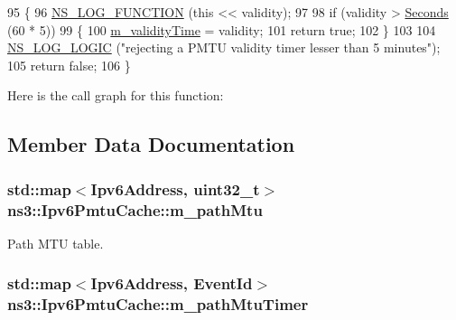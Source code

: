 \begin{DoxyCode}
95 \{
96   \hyperlink{log-macros-disabled_8h_a90b90d5bad1f39cb1b64923ea94c0761}{NS\_LOG\_FUNCTION} (\textcolor{keyword}{this} << validity);
97 
98   \textcolor{keywordflow}{if} (validity > \hyperlink{group__timecivil_ga33c34b816f8ff6628e33d5c8e9713b9e}{Seconds} (60 * 5))
99     \{
100       \hyperlink{classns3_1_1Ipv6PmtuCache_aad204229ec877a85eaebb1e9dd0f01d2}{m\_validityTime} = validity;
101       \textcolor{keywordflow}{return} \textcolor{keyword}{true};
102     \}
103 
104   \hyperlink{group__logging_ga88acd260151caf2db9c0fc84997f45ce}{NS\_LOG\_LOGIC} (\textcolor{stringliteral}{"rejecting a PMTU validity timer lesser than 5 minutes"});
105   \textcolor{keywordflow}{return} \textcolor{keyword}{false};
106 \}
\end{DoxyCode}


Here is the call graph for this function\+:




\subsection{Member Data Documentation}
\subsubsection[{\texorpdfstring{m\+\_\+path\+Mtu}{m_pathMtu}}]{\setlength{\rightskip}{0pt plus 5cm}std\+::map$<${\bf Ipv6\+Address}, uint32\+\_\+t$>$ ns3\+::\+Ipv6\+Pmtu\+Cache\+::m\+\_\+path\+Mtu\hspace{0.3cm}{\ttfamily [private]}}\hypertarget{classns3_1_1Ipv6PmtuCache_a585f564725b0017c22fb0a25029d481e}{}\label{classns3_1_1Ipv6PmtuCache_a585f564725b0017c22fb0a25029d481e}


Path M\+TU table. 

\subsubsection[{\texorpdfstring{m\+\_\+path\+Mtu\+Timer}{m_pathMtuTimer}}]{\setlength{\rightskip}{0pt plus 5cm}std\+::map$<${\bf Ipv6\+Address}, {\bf Event\+Id}$>$ ns3\+::\+Ipv6\+Pmtu\+Cache\+::m\+\_\+path\+Mtu\+Timer\hspace{0.3cm}{\ttfamily [private]}}\hypertarget{classns3_1_1Ipv6PmtuCache_a8f494fe1cc83f8e026bf68fd8e19a2e7}{}\label{classns3_1_1Ipv6PmtuCache_a8f494fe1cc83f8e026bf68fd8e19a2e7}


